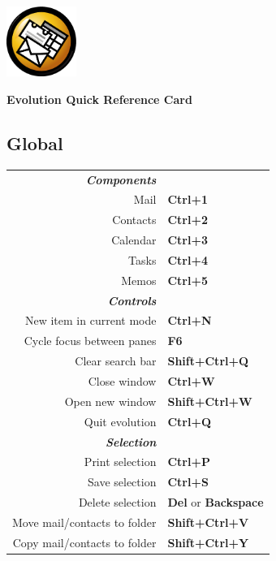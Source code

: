 \documentclass[12pt]{article}
\date {}
\begin{document}
	\begin{landscape}


	\begin{center}
	\begin{minipage}[m]
		{1in}\includegraphics[height=0.9in]{../evolution-logo.eps}\hspace{5mm}
	\end{minipage}
	\hspace{5mm}
	\textbf{\Huge{Evolution Quick Reference Card}}
	\end{center}

	\begin{center}
	\begin{multicols}{2}
	\section*{Global}
	\begin{tabular*}{4in}{rp{1.5in}}
		\textit{\textbf{Components}}		&					\\
		Mail					& \textbf{Ctrl+1}			\\
		Contacts				& \textbf{Ctrl+2}			\\
		Calendar				& \textbf{Ctrl+3}			\\
		Tasks					& \textbf{Ctrl+4}			\\
		\vspace{1.5mm}
		Memos					& \textbf{Ctrl+5}			\\
		\textit{\textbf{Controls}}		&					\\
		New item in current mode		& \textbf{Ctrl+N}			\\
		Cycle focus between panes		& \textbf{F6}				\\
		Clear search bar			& \textbf{Shift+Ctrl+Q}			\\
		Close window				& \textbf{Ctrl+W}			\\
		Open new window				& \textbf{Shift+Ctrl+W}			\\
		\vspace{1.5mm}
		Quit evolution				& \textbf{Ctrl+Q}			\\
		\textit{\textbf{Selection}}		&					\\
		Print selection				& \textbf{Ctrl+P}			\\
		Save selection				& \textbf{Ctrl+S}			\\
		Delete selection			& \textbf{Del} or \textbf{Backspace}	\\
		Move mail/contacts to folder		& \textbf{Shift+Ctrl+V}			\\
		Copy mail/contacts to folder		& \textbf{Shift+Ctrl+Y}			\\
	\end{tabular*}

\end{multicols}
\end{center}
\end{landscape}
\end{document}
